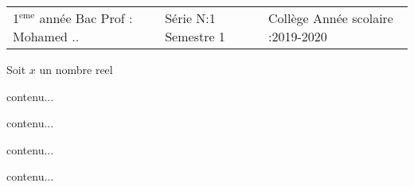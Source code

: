 \documentclass[12pt,a4paper,fleqn]{article}
\begin{document}
\begin{entete}
 \begin{tabular}{m{4.5cm}m{7.2cm}m{5cm}}
  1$^\text{eme}$ année Bac\newline
  Prof : Mohamed .. & Série  N:1 \newline
  \centering Semestre 1 & Collège   \newline
  Année scolaire :2019-2020
 \end{tabular}
\end{entete}

\begin{Exercice}
 Soit $x$ un nombre reel 
\end{Exercice}

\begin{Exercice}
 contenu...
\end{Exercice}

\begin{Exercice}
 contenu...
\end{Exercice}

\begin{Exercice}
 contenu...
\end{Exercice}

\begin{Exercice}
 contenu...
\end{Exercice}
\end{document}
